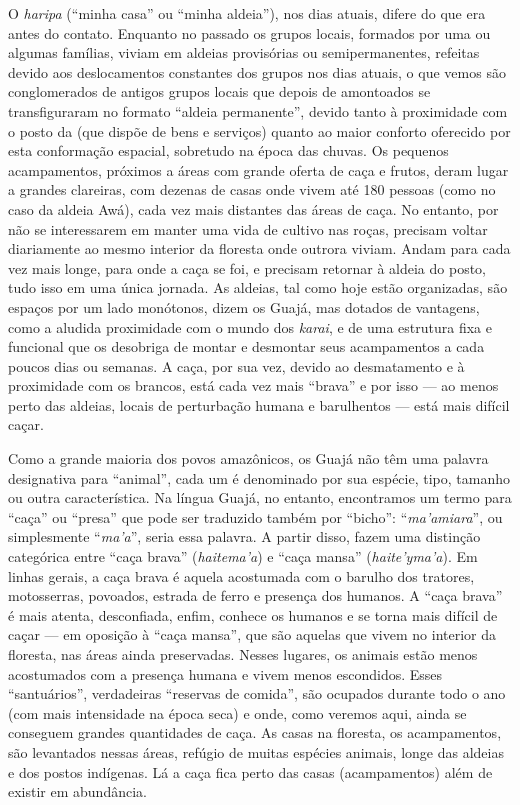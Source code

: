 O \emph{haripa} (``minha casa'' ou ``minha aldeia''), nos dias atuais,
difere do que era antes do contato. Enquanto no passado os grupos
locais, formados por uma ou algumas famílias, viviam em aldeias
provisórias ou semipermanentes, refeitas devido aos deslocamentos
constantes dos grupos nos dias atuais, o que vemos são conglomerados de
antigos grupos locais que depois de amontoados se transfiguraram no
formato ``aldeia permanente'', devido tanto à proximidade com o posto da
 (que dispõe de bens e serviços) quanto ao maior conforto oferecido
por esta conformação espacial, sobretudo na época das chuvas. Os
pequenos acampamentos, próximos a áreas com grande oferta de caça e
frutos, deram lugar a grandes clareiras, com dezenas de casas onde vivem
até 180 pessoas (como no caso da aldeia Awá), cada vez mais
distantes das áreas de caça. No entanto, por não se interessarem em
manter uma vida de cultivo nas roças, precisam voltar diariamente ao
mesmo interior da floresta onde outrora viviam. Andam para cada vez mais
longe, para onde a caça se foi, e precisam retornar à aldeia do posto,
tudo isso em uma única jornada. As aldeias, tal como hoje estão
organizadas, são espaços por um lado monótonos, dizem os Guajá, mas
dotados de vantagens, como a aludida proximidade com o mundo dos
\emph{karai}, e de uma estrutura fixa e funcional que os desobriga de
montar e desmontar seus acampamentos a cada poucos dias ou semanas. A
caça, por sua vez, devido ao desmatamento e à proximidade com os
brancos, está cada vez mais ``brava'' e por isso --- ao menos perto das
aldeias, locais de perturbação humana e barulhentos --- está mais difícil
caçar.

Como a grande maioria dos povos amazônicos, os Guajá não têm uma palavra
designativa para ``animal'', cada um é denominado por sua espécie, tipo,
tamanho ou outra característica. Na língua Guajá, no entanto,
encontramos um termo para ``caça'' ou ``presa'' que pode ser traduzido
também por ``bicho'': ``\emph{ma'amiara}'', ou simplesmente
``\emph{ma'a}'', seria essa palavra. A partir disso, fazem uma distinção
categórica entre ``caça brava'' (\emph{haitema'a}) e ``caça mansa''
(\emph{haite'yma'a}). Em linhas gerais, a caça brava é aquela acostumada
com o barulho dos tratores, motosserras, povoados, estrada de ferro e
presença dos humanos. A ``caça brava'' é mais atenta, desconfiada, enfim,
conhece os humanos e se torna mais difícil de caçar --- em oposição à
``caça mansa'', que são aquelas que vivem no interior da floresta, nas
áreas ainda preservadas. Nesses lugares, os animais estão menos
acostumados com a presença humana e vivem menos escondidos. Esses
``santuários'', verdadeiras ``reservas de comida'', são ocupados durante
todo o ano (com mais intensidade na época seca) e onde, como veremos
aqui, ainda se conseguem grandes quantidades de caça. As casas na
floresta, os acampamentos, são levantados nessas áreas, refúgio de
muitas espécies animais, longe das aldeias e dos postos indígenas. Lá a
caça fica perto das casas (acampamentos) além de existir em abundância.

